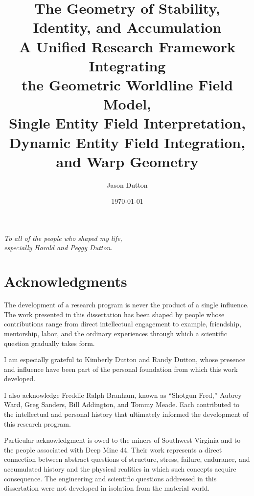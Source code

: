 \documentclass[12pt,oneside]{book}
\title{
    \textbf{The Geometry of Stability, Identity, and Accumulation}\\[1.5em]
    \large
    A Unified Research Framework Integrating\\
    the Geometric Worldline Field Model,\\
    Single Entity Field Interpretation,\\
    Dynamic Entity Field Integration,\\
    and Warp Geometry
}
\author{
    Jason Dutton
}
\date{\today}
\begin{document}
\maketitle

\cleardoublepage
\thispagestyle{empty}

\begin{center}
    \vspace*{\fill}

    \textit{To all of the people who shaped my life,}\\
    \textit{especially Harold and Peggy Dutton.}

    \vspace*{\fill}
\end{center}

\cleardoublepage


\chapter*{Acknowledgments}

The development of a research program is never the product of
a single influence. The work presented in this dissertation
has been shaped by people whose contributions range from direct
intellectual engagement to example, friendship, mentorship,
labor, and the ordinary experiences through which a scientific
question gradually takes form.

I am especially grateful to Kimberly Dutton and Randy Dutton,
whose presence and influence have been part of the personal
foundation from which this work developed.

I also acknowledge Freddie Ralph Branham, known as ``Shotgun
Fred,'' Aubrey Ward, Greg Sanders, Bill Addington, and Tommy
Meade. Each contributed to the intellectual and personal history
that ultimately informed the development of this research
program.

Particular acknowledgment is owed to the miners of Southwest
Virginia and to the people associated with Deep Mine 44. Their
work represents a direct connection between abstract questions
of structure, stress, failure, endurance, and accumulated
history and the physical realities in which such concepts
acquire consequence. The engineering and scientific questions
addressed in this dissertation were not developed in isolation
from the material world.
\end{document}
